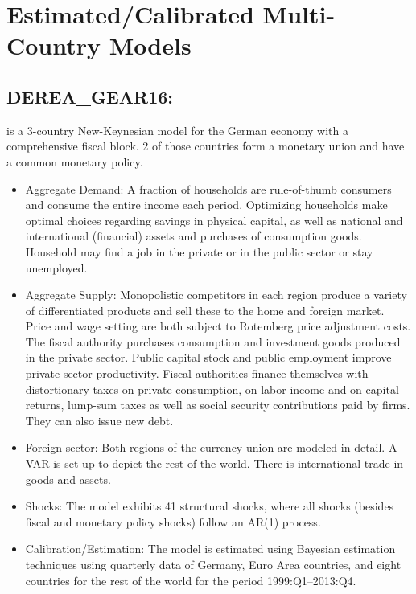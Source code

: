 \documentclass[11pt,a4paper]{article}
\begin{document}
	
	
	
	
	\section{Estimated/Calibrated Multi-Country Models}
	
	\subsection{DEREA\_GEAR16: \cite{gadatsch2016fiscal}}
	\label{DEREAGEAR16}
	\cite{gadatsch2016fiscal} is a 3-country New-Keynesian model for the German economy with a comprehensive fiscal block. 2 of those countries form a monetary union and have a common monetary policy. 
	\begin{itemize}
	\item Aggregate Demand: A fraction of households are rule-of-thumb consumers and consume the entire income each period. Optimizing households make optimal choices regarding savings in physical capital, as well as national and international (financial) assets and purchases of consumption goods. Household may ﬁnd a job in the private or in the public sector or stay unemployed.
	
	\item Aggregate Supply: Monopolistic competitors in each region produce a variety of differentiated products and sell these to the home and foreign market. Price and wage setting are both subject to Rotemberg price adjustment costs. The fiscal authority purchases consumption and investment goods produced in the private sector. Public capital stock and public employment improve private-sector productivity. Fiscal authorities finance themselves with distortionary taxes on private consumption, on labor income and on capital returns, lump-sum taxes as well as social security contributions paid by firms. They can also issue new debt.
	
	\item Foreign sector: Both regions of the currency union are modeled in detail. A VAR is set up to depict the rest of the world. There is international trade in goods and assets.
	
	\item Shocks: The model exhibits 41 structural shocks, where all shocks (besides fiscal and monetary policy shocks) follow an AR(1) process. 
	
	\item Calibration/Estimation: The model is estimated using Bayesian estimation techniques using quarterly data of Germany, Euro Area countries, and eight countries for the rest of the world for the period 1999:Q1–2013:Q4.
	\end{itemize}
	
\end{document}
